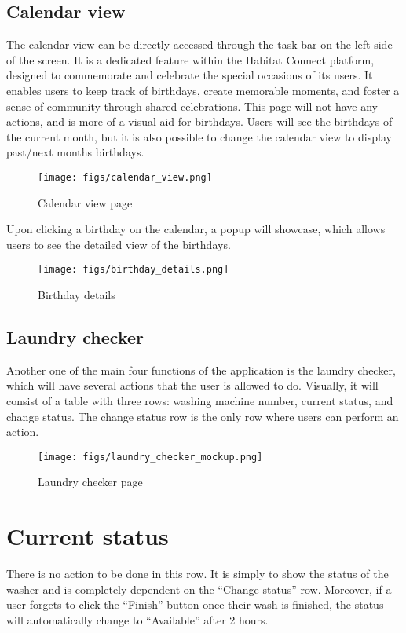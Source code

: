 \documentclass[conference]{IEEEtran}
\begin{document}
\subsection{Calendar view}
The calendar view can be directly accessed through the task bar on the left side of the screen. It is a dedicated feature within the Habitat Connect platform, designed to commemorate and celebrate the special occasions of its users. It enables users to keep track of birthdays, create memorable moments, and foster a sense of community through shared celebrations. This page will not have any actions, and is more of a visual aid for birthdays. Users will see the birthdays of the current month, but it is also possible to change the calendar view to display past/next months birthdays.
\begin{figure}[H]
\centering
\texttt{[image: figs/calendar\_view.png]}
\caption{Calendar view page}
\label{fig:Calendar view page}
\end{figure}
Upon clicking a birthday on the calendar, a popup will showcase, which allows users to see the detailed view of the birthdays.
\begin{figure}[H]
\centering
\texttt{[image: figs/birthday\_details.png]}
\caption{Birthday details}
\label{fig:Birthday details}
\end{figure}
\subsection{Laundry checker}
Another one of the main four functions of the application is the laundry checker, which will have several actions that the user is allowed to do. Visually, it will consist of a table with three rows: washing machine number, current status, and change status. The change status row is the only row where users can perform an action.
\begin{figure}[H]
\centering
\texttt{[image: figs/laundry\_checker\_mockup.png]}
\caption{Laundry checker page}
\label{fig:Laundry checker page}
\end{figure}
\section*{Current status}
There is no action to be done in this row. It is simply to show the status of the washer and is completely dependent on the “Change status” row. Moreover, if a user forgets to click the “Finish” button once their wash is finished, the status will automatically change to “Available” after 2 hours.
\end{document}
